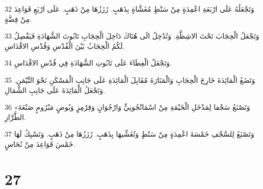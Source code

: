 \par 32 وَتَجْعَلُهُ عَلَى ارْبَعَةِ اعْمِدَةٍ مِنْ سَنْطٍ مُغَشَّاةٍ بِذَهَبٍ. رُزَزُهَا مِنْ ذَهَبٍ. عَلَى ارْبَعِ قَوَاعِدَ مِنْ فِضَّةٍ.
\par 33 وَتَجْعَلُ الْحِجَابَ تَحْتَ الاشِظَّةِ. وَتُدْخِلُ الَى هُنَاكَ دَاخِلَ الْحِجَابِ تَابُوتَ الشَّهَادَةِ فَيَفْصِلُ لَكُمُ الْحِجَابُ بَيْنَ الْقُدْسِ وَقُدْسِ الاقْدَاسِ.
\par 34 وَتَجْعَلُ الْغِطَاءَ عَلَى تَابُوتِ الشَّهَادَةِ فِي قُدْسِ الاقْدَاسِ.
\par 35 وَتَضَعُ الْمَائِدَةَ خَارِجَ الْحِجَابِ وَالْمَنَارَةَ مُقَابِلَ الْمَائِدَةِ عَلَى جَانِبِ الْمَسْكَنِ نَحْوَ التَّيْمَنِ. وَتَجْعَلُ الْمَائِدَةَ عَلَى جَانِبِ الشِّمَالِ.
\par 36 «وَتَصْنَعُ سَجْفا لِمَدْخَلِ الْخَيْمَةِ مِنْ اسْمَانْجُونِيٍّ وَارْجُوَانٍ وَقِرْمِزٍ وَبُوصٍ مَبْرُومٍ صَنْعَةَ الطَّرَّازِ.
\par 37 وَتَصْنَعُ لِلسَّجْفِ خَمْسَةَ اعْمِدَةٍ مِنْ سَنْطٍ وَتُغَشِّيهَا بِذَهَبٍ. رُزَزُهَا مِنْ ذَهَبٍ. وَتَسْبِكُ لَهَا خَمْسَ قَوَاعِدَ مِنْ نُحَاسٍ.

\chapter{27}

